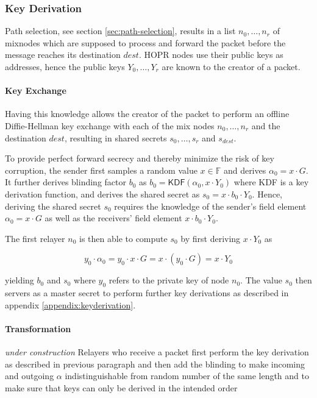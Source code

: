 \subsubsection{Key Derivation}
\label{sec:sphinx:keyderivation}

Path selection, see section \ref{sec:path-selection}, results in a list $n_0, \dots, n_r$ of mixnodes which are supposed to process and forward the packet before the message reaches its destination $dest$. HOPR nodes use their public keys as addresses, hence the public keys $Y_0, \dots , Y_r$ are known to the creator of a packet.

\paragraph{Key Exchange}

Having this knowledge allows the creator of the packet to perform an offline Diffie-Hellman key exchange with each of the mix nodes $n_0 , \dots , n_r$ and the destination $dest$, resulting in shared secrets $s_0, \dots , s_r$ and $s_{dest}$.

To provide perfect forward secrecy and thereby minimize the risk of key corruption, the sender first samples a random value $x \in \mathbb{F}$ and derives $\alpha_0 = x \cdot G$. It further derives blinding factor $b_0$ as $b_0 = \mathsf{KDF}(\alpha_0, x \cdot Y_0)$ where \textsf{KDF} is a key derivation function, and derives the shared secret as $s_0 = x \cdot b_0 \cdot Y_0$. Hence, deriving the shared secret $s_0$ requires the knowledge of the sender's field element $\alpha_0 = x \cdot G$ as well as the receivers' field element $x \cdot b_0 \cdot Y_0$.

The first relayer $n_0$ is then able to compute $s_0$ by first deriving $x \cdot Y_0$ as

$$y_0 \cdot \alpha_0 = y_0 \cdot x \cdot G = x \cdot ( y_0 \cdot G) = x \cdot Y_0$$

yielding $b_0$ and $s_0$ where $y_0$ refers to the private key of node $n_0$. The value $s_0$ then servers as a master secret to perform further key derivations as described in appendix \ref{appendix:keyderivation}.

\paragraph{Transformation}

\textit{under construction}
Relayers who receive a packet first perform the key derivation as described in previous paragraph and then add the blinding to make incoming and outgoing $\alpha$ indistinguishable from random number of the same length and to make sure that keys can only be derived in the intended order

